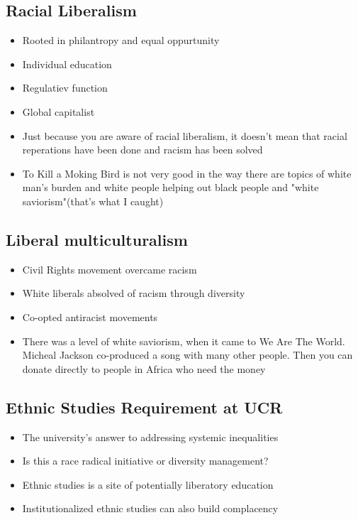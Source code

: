 \documentclass{article}
\begin{document}
\subsection{Racial Liberalism}
\begin{itemize}
  \item Rooted in philantropy and equal oppurtunity
  \item Individual education
  \item Regulatiev function
  \item Global capitalist
  \item Just because you are aware of racial liberalism,
    it doesn't mean that racial reperations have been done and racism has
    been solved
  \item To Kill a Moking Bird is not very good in the way there are
    topics of white man's burden and white people helping out black people and "white saviorism"(that's what I caught)
\end{itemize}

\subsection{Liberal multiculturalism}
\begin{itemize}
  \item Civil Rights movement overcame racism
  \item White liberals absolved of racism through diversity
  \item Co-opted antiracist movements
  \item There was a level of white saviorism, when it came to We Are The World.
    Micheal Jackson co-produced a song with many other people. Then you can donate directly
    to people in Africa who need the money
\end{itemize}

\subsection{Ethnic Studies Requirement at UCR}
\begin{itemize}
  \item The university's answer to addressing systemic inequalities
  \item Is this a race radical initiative or diversity management?
  \item Ethnic studies is a site of potentially liberatory education
  \item Institutionalized ethnic studies can also build complacency
\end{itemize}
\end{document}
